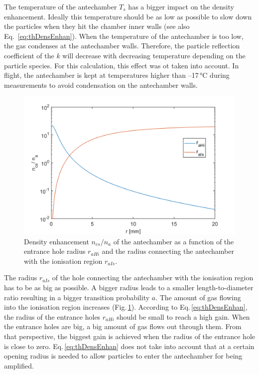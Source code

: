 	The temperature of the antechamber $T_s$ has a bigger impact on the density enhancement. Ideally this temperature should be as low as possible to slow down the particles when they hit the chamber inner walls (see also Eq.~\eqref{eq:thDensEnhan}). When the temperature of the antechamber is too low, the gas condenses at the antechamber walls. Therefore, the particle reflection coefficient of the $k$ will decrease with decreasing temperature depending on the particle species. For this calculation, this effect was ot taken into account. In flight, the antechamber is kept at temperatures higher than --17\,\si{\degreeCelsius} during measurements to avoid condensation on the antechamber walls.\\
	\begin{figure}[h] %
		\centering
		\includegraphics[width= .7\textwidth]{Bilder/raHi_raIs.png}
		\caption{Density enhancement $n_{cs}/n_a$ of the antechamber as a function of the entrance hole radius $r_{aHi}$ and the radius connecting the antechamber with the ionisation region $r_{aIs}$.}
		\label{th:densEnhraHiraIs}
	\end{figure}
	The radius $r_{aIs}$ of the hole connecting the antechamber with the ionisation region has to be as big as possible. A bigger radius leads to a smaller length-to-diameter ratio resulting in a bigger transition probability $a$. The amount of gas flowing into the ionisation region increases (Fig.\,\ref{th:densEnhraHiraIs}). According to Eq.\,\eqref{eq:thDensEnhan}, the radius of the entrance holes $r_{aHi}$ should be small to reach a high gain. When the entrance holes are big, a big amount of gas flows out through them. From that perspective, the biggest gain is achieved when the radius of the entrance hole is close to zero. Eq.\,\eqref{eq:thDensEnhan} does not take into account that at a certain opening radius is needed to allow particles to enter the antechamber for being amplified.\\
